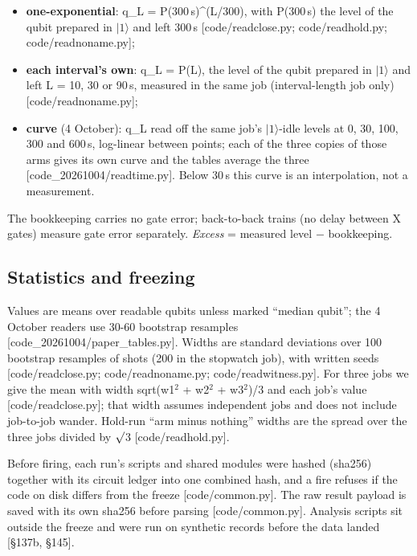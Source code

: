 \documentclass[11pt]{article}
\begin{document}
\begin{itemize}
\item \textbf{one-exponential}: q\_L = P(300\,\textmu s)\^{}(L/300), with P(300\,\textmu s) the level of the qubit prepared in \(|1\rangle\) and left 300\,\textmu s {[}code/readclose.py; code/readhold.py; code/readnoname.py{]};
\item \textbf{each interval's own}: q\_L = P(L), the level of the qubit prepared in \(|1\rangle\) and left L = 10, 30 or 90\,\textmu s, measured in the same job (interval-length job only) {[}code/readnoname.py{]};
\item \textbf{curve} (4 October): q\_L read off the same job's \(|1\rangle\)-idle levels at 0, 30, 100, 300 and 600\,\textmu s, log-linear between points; each of the three copies of those arms gives its own curve and the tables average the three {[}code\_20261004/readtime.py{]}. Below 30\,\textmu s this curve is an interpolation, not a measurement.
\end{itemize}
The bookkeeping carries no gate error; back-to-back trains (no delay between X gates) measure gate error separately. \emph{Excess} = measured level \(-\) bookkeeping.

\subsection{Statistics and freezing}
Values are means over readable qubits unless marked ``median qubit''; the 4 October readers use 30-60 bootstrap resamples {[}code\_20261004/paper\_tables.py{]}. Widths are standard deviations over 100 bootstrap resamples of shots (200 in the stopwatch job), with written seeds {[}code/readclose.py; code/readnoname.py; code/readwitness.py{]}. For three jobs we give the mean with width sqrt(w1\(^2\) + w2\(^2\) + w3\(^2\))/3 and each job's value {[}code/readclose.py{]}; that width assumes independent jobs and does not include job-to-job wander. Hold-run ``arm minus nothing'' widths are the spread over the three jobs divided by \(\surd\)3 {[}code/readhold.py{]}.

Before firing, each run's scripts and shared modules were hashed (sha256) together with its circuit ledger into one combined hash, and a fire refuses if the code on disk differs from the freeze {[}code/common.py{]}. The raw result payload is saved with its own sha256 before parsing {[}code/common.py{]}. Analysis scripts sit outside the freeze and were run on synthetic records before the data landed {[}\S{}137b, \S{}145{]}.
\end{document}
